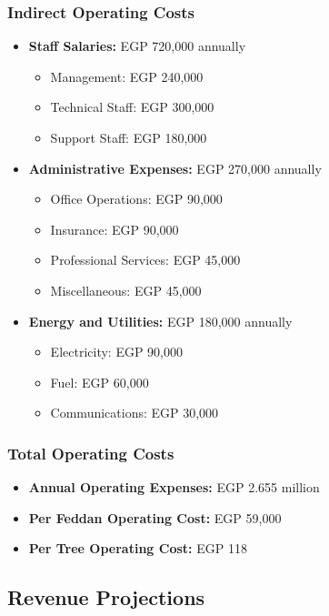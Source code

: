 \subsubsection{Indirect Operating Costs}
\begin{itemize}
    \item \textbf{Staff Salaries:} EGP 720,000 annually
    \begin{itemize}
        \item Management: EGP 240,000
        \item Technical Staff: EGP 300,000
        \item Support Staff: EGP 180,000
    \end{itemize}
    
    \item \textbf{Administrative Expenses:} EGP 270,000 annually
    \begin{itemize}
        \item Office Operations: EGP 90,000
        \item Insurance: EGP 90,000
        \item Professional Services: EGP 45,000
        \item Miscellaneous: EGP 45,000
    \end{itemize}
    
    \item \textbf{Energy and Utilities:} EGP 180,000 annually
    \begin{itemize}
        \item Electricity: EGP 90,000
        \item Fuel: EGP 60,000
        \item Communications: EGP 30,000
    \end{itemize}
\end{itemize}

\subsubsection{Total Operating Costs}
\begin{itemize}
    \item \textbf{Annual Operating Expenses:} EGP 2.655 million
    \item \textbf{Per Feddan Operating Cost:} EGP 59,000
    \item \textbf{Per Tree Operating Cost:} EGP 118
\end{itemize}

\subsection{Revenue Projections}

